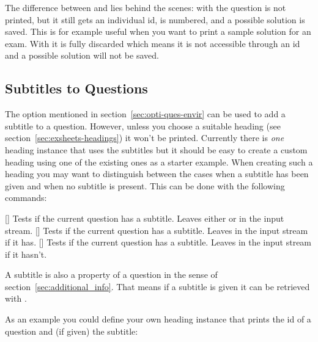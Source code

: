 \documentclass[load-preamble+,scrartcl={DIV10}]{cnltx-doc}
\begin{document}
The difference between  and  lies behind the scenes:
with  the question is not printed, but it still gets an
individual \ac{id}, is numbered, and a possible solution is saved.  This is
for example useful when you want to print a sample solution for an exam.  With
 it is fully discarded which means it is not accessible
through an \acs{id} and a possible solution will not be saved.

\subsection{Subtitles to Questions}\label{sec:subtitles-questions}
The  option mentioned in section~\ref{sec:opti-ques-envir}
can be used to add a subtitle to a question.  However, unless you choose a
suitable heading (see section~\ref{sec:exsheets-headings}) it won't be
printed.  Currently there is \emph{one} heading instance that uses the
subtitles but it should be easy to create a custom heading using one of the
existing ones as a starter example.  When creating such a heading you may want
to distinguish between the cases when a subtitle has been given and when no
subtitle is present.  This can be done with the following commands:
\begin{commands}
  \expandable{}[]
    Tests if the current question has a subtitle.  Leaves either  or  in the input stream.
  \expandable{}[]
    Tests if the current question has a subtitle.  Leaves  in
    the input stream if it has.
  \expandable{}[]
    Tests if the current question has a subtitle.  Leaves  in
    the input stream if it hasn't.
\end{commands}

A subtitle is also a property of a question in the sense of
section~\ref{sec:additional_info}.  That means if a subtitle is given it can
be retrieved with .

As an example you could define your own heading instance that prints the
\acs{id} of a question and (if given) the subtitle:

\begin{sourcecode}
\end{sourcecode}
\end{document}

